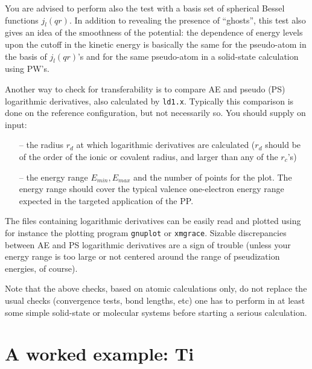 \documentclass[12pt,a4paper]{article}
\begin{document}
You are advised to perform also the test with a basis set of spherical
Bessel functions $j_l (qr)$. In addition to revealing the presence of
``ghosts'', this test also gives an idea of the smoothness of the 
potential: the dependence of energy levels upon the cutoff in the kinetic 
energy is basically the same for the pseudo-atom in the basis of $j_l (qr)$'s
and for the same pseudo-atom in a solid-state calculation using PW's.

Another way to check for transferability is to compare AE and pseudo (PS) 
logarithmic derivatives, also calculated by \texttt{ld1.x}. Typically 
this comparison is done on the reference configuration,
but not necessarily so. You should supply on input:
\begin{enumerate}
\item[--] the radius $r_d$ at which logarithmic derivatives are 
          calculated ($r_d$ should be of the order of the
          ionic or covalent radius, and larger than any of the $r_c$'s)
\item[--] the energy range $E_{min}, E_{max}$ and the number 
          of points for the plot. The energy range
          should cover the typical valence one-electron energy 
          range expected in the targeted application of the PP. 
\end{enumerate}
The files containing logarithmic derivatives can be easily read and 
plotted using for instance the plotting program \texttt{gnuplot} 
or \texttt{xmgrace}. 
Sizable discrepancies between AE and PS logarithmic derivatives 
are a sign of trouble (unless your energy range is too large or 
not centered around the range of pseudization energies, of course).

Note that the above checks, based on atomic calculations only,
do not replace the usual checks (convergence tests, bond lengths,
etc) one has to perform in at least some simple solid-state or 
molecular systems before starting a serious calculation.

\section{A worked example: Ti}
\end{document}
